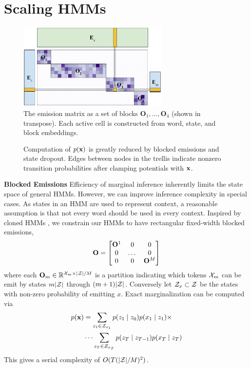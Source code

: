 \documentclass[11pt,a4paper]{article}
\begin{document}
\section{Scaling HMMs}
\label{sec:methods}

\begin{figure}[t]
\centering
\includegraphics[height=1.7in]{img/mat.pdf}
\caption{\label{fig:emit}
The emission matrix as a set of blocks $\mathbf{O}_1, \ldots, \mathbf{O}_4$ (shown in transpose). Each active cell is constructed from word, state, and block embeddings. 
}
\end{figure}

\begin{figure}[!t]
\begin{center}

\end{center}
\caption{
\label{fig:trellis}
Computation of $p(\mathbf{x})$ is greatly reduced by blocked emissions
and state dropout. Edges between nodes in the trellis indicate
nonzero transition probabilities after clamping potentials with $\mathbf{x}$.
}
\end{figure}

\noindent
\textbf{Blocked Emissions} Efficiency of marginal inference inherently limits 
the state space of general HMMs.
However, we can improve inference complexity in special cases.
As states in an HMM are used to represent context, a reasonable assumption
is that not every word should be used in every context.
Inspired by cloned HMMs \citep{dedieu2019learning},
we constrain our HMMs to have rectangular fixed-width blocked emissions,
\[\mathbf{O} = \begin{bmatrix} \mathbf{O}^1 & 0 & 0 \\ 0 & $\dots$ & 0 \\ 0 & 0 & \mathbf{O}^M \\
\end{bmatrix}\]
where each $\mathbf{O}_m \in \mathbb{R}^{ {\cal X}_m \times |{\cal Z}|/M}$
is a partition indicating which tokens ${\cal X}_m$ can be emit by states
$m|{\cal Z}|$ through $(m+1)|{\cal Z}|$.
Conversely let $\mathcal{Z}_x \subset {\cal Z}$ be the states with non-zero probability of emitting $x$.
Exact marginalization can be computed via 
\begin{equation}
\label{eqn:sparse_marginalization}
\begin{aligned}
p(\mathbf{x}) &= \sum_{z_1 \in \mathcal{Z}_{x_1}} p(z_1\mid z_0)p(x_1 \mid z_1) \times\\
    &\cdots
    \sum_{z_T \in \mathcal{Z}_{x_T}} p(z_T \mid z_{T-1})p(x_T \mid z_T)
\end{aligned}
\end{equation}
This gives a serial complexity of $O(T(|\mathcal{Z}|/M)^2)$.
\end{document}
